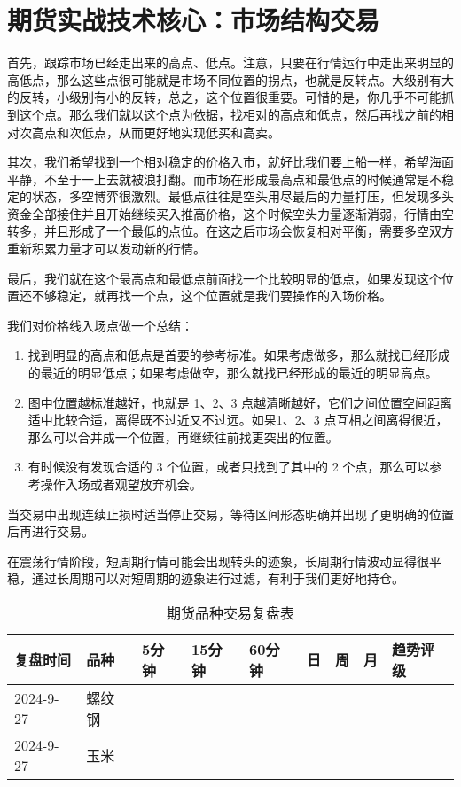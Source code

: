 \chapter{期货实战技术核心：市场结构交易}

首先，跟踪市场已经走出来的高点、低点。注意，只要在行情运行中走出来明显的高低点，那么这些点很可能就是市场不同位置的拐点，也就是反转点。大级别有大的反转，小级别有小的反转，总之，这个位置很重要。可惜的是，你几乎不可能抓到这个点。那么我们就以这个点为依据，找相对的高点和低点，然后再找之前的相对次高点和次低点，从而更好地实现低买和高卖。

其次，我们希望找到一个相对稳定的价格入市，就好比我们要上船一样，希望海面平静，不至于一上去就被浪打翻。而市场在形成最高点和最低点的时候通常是不稳定的状态，多空博弈很激烈。最低点往往是空头用尽最后的力量打压，但发现多头资金全部接住并且开始继续买入推高价格，这个时候空头力量逐渐消弱，行情由空转多，并且形成了一个最低的点位。在这之后市场会恢复相对平衡，需要多空双方重新积累力量才可以发动新的行情。

最后，我们就在这个最高点和最低点前面找一个比较明显的低点，如果发现这个位置还不够稳定，就再找一个点，这个位置就是我们要操作的入场价格。

我们对价格线入场点做一个总结：

\begin{enumerate}
    \item 找到明显的高点和低点是首要的参考标准。如果考虑做多，那么就找已经形成的最近的明显低点；如果考虑做空，那么就找已经形成的最近的明显高点。
    \item 图中位置越标准越好，也就是 1、2、3 点越清晰越好，它们之间位置空间距离适中比较合适，离得既不过近又不过远。如果1、2、3 点互相之间离得很近，那么可以合并成一个位置，再继续往前找更突出的位置。
    \item 有时候没有发现合适的 3 个位置，或者只找到了其中的 2 个点，那么可以参考操作入场或者观望放弃机会。
\end{enumerate}

当交易中出现连续止损时适当停止交易，等待区间形态明确并出现了更明确的位置后再进行交易。


在震荡行情阶段，短周期行情可能会出现转头的迹象，长周期行情波动显得很平稳，通过长周期可以对短周期的迹象进行过滤，有利于我们更好地持仓。

\begin{table}
    \centering
    \caption{期货品种交易复盘表}
    \begin{tabular}{lllllllll}
        \hline
        复盘时间      & 品种  & 5分钟 & 15分钟 & 60分钟 & 日 & 周 & 月 & 趋势评级 \\
        \hline
        2024-9-27 & 螺纹钢 &     &      &      &   &   &   &      \\
        2024-9-27 & 玉米  &     &      &      &   &   &   &      \\
        \hline
    \end{tabular}
\end{table}
